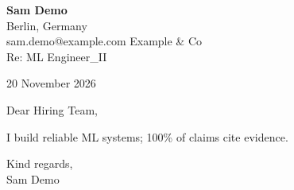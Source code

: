 \documentclass[11pt,a4paper]{article}
\begin{document}
\textbf{Sam Demo}\\
Berlin, Germany\\
sam.demo@example.com
\vspace{12pt}
Example \& Co\\
Re: ML Engineer\_II

\hfill 20 November 2026

Dear Hiring Team,

I build reliable ML systems; 100\% of claims cite evidence.

Kind regards,\\[18pt]
Sam Demo
\end{document}
